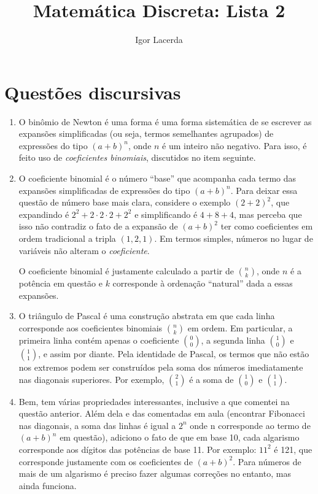 \documentclass{article}
\title{Matemática Discreta: Lista 2}
\author{Igor Lacerda}
\begin{document}
\maketitle
\section*{Questões discursivas}
\begin{enumerate}
    \item O binômio de Newton é uma forma é uma forma sistemática de se escrever as expansões simplificadas (ou seja, termos semelhantes agrupados) de expressões do tipo \( (a + b)^{n} \), onde \( n \) é um inteiro não negativo. Para isso, é feito uso de \textit{coeficientes binomiais}, discutidos no item seguinte.

    \item O coeficiente binomial é o número ``base'' que acompanha cada termo das expansões simplificadas de expressões do tipo \( (a+b)^{n} \). Para deixar essa questão de número base mais clara, considere o exemplo \( (2 + 2)^{2} \), que expandindo é \( 2^{2} + 2 \cdot 2 \cdot 2 + 2^{2} \) e simplificando é \( 4 + 8 + 4 \), mas perceba que isso não contradiz o fato de a expansão de \( (a+b)^2 \) ter como coeficientes em ordem tradicional a tripla \( (1,2,1) \). Em termos simples, números no lugar de variáveis não alteram o \textit{coeficiente}.

        O coeficiente binomial é justamente calculado a partir de \( n \choose k \), onde \( n \) é a potência em questão e \( k \) corresponde à ordenação ``natural'' dada a essas expansões.

    \item O triângulo de Pascal é uma construção abstrata em que cada linha corresponde aos coeficientes binomiais \( n \choose k \) em ordem. Em particular, a primeira linha contém apenas o coeficiente \( 0 \choose 0 \), a segunda linha \( 1 \choose 0 \) e \( 1 \choose 1 \), e assim por diante. Pela identidade de Pascal, os termos que não estão nos extremos podem ser construídos pela soma dos números imediatamente nas diagonais superiores. Por exemplo, \( 2 \choose 1 \) é a soma de \( 1 \choose 0 \) e \( 1 \choose 1 \). 

    \item Bem, tem várias propriedades interessantes, inclusive a que comentei na questão anterior. Além dela e das comentadas em aula (encontrar Fibonacci nas diagonais, a soma das linhas é igual a \( 2^{n} \) onde n corresponde ao termo de \( (a + b)^n \) em questão), adiciono o fato de que em base 10, cada algarismo corresponde aos dígitos das potências de base 11. Por exemplo: \( 11^{2} \) é 121, que corresponde justamente com os coeficientes de \( (a + b)^2 \). Para números de mais de um algarismo é preciso fazer algumas correções no entanto, mas ainda funciona. 


\end{enumerate}
\end{document}
